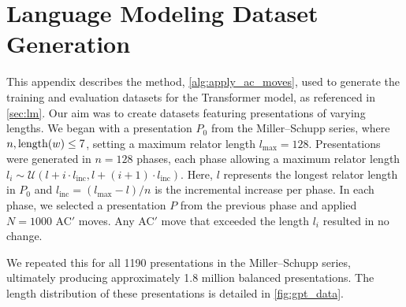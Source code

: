 
\section{Language Modeling Dataset Generation \label{app:algorithm}}

This appendix describes the method, \autoref{alg:apply_ac_moves}, used to generate the training and evaluation datasets for the Transformer model, as referenced in \autoref{sec:lm}. Our aim was to create datasets featuring presentations of varying lengths. We began with a presentation \(P_0\) from the Miller--Schupp series, where \(n, \operatorname{length}(w) \leq 7\), setting a maximum relator length \(l_{\text{max}} = 128\). Presentations were generated in \(n=128\) phases, each phase allowing a maximum relator length \(l_i \sim \mathcal{U}(l + i \cdot l_{\text{inc}}, l + (i+1) \cdot l_{\text{inc}})\). Here, \(l\) represents the longest relator length in \(P_0\) and \(l_{\text{inc}} = (l_{\text{max}} - l)/n\) is the incremental increase per phase. In each phase, we selected a presentation \(P\) from the previous phase and applied \(N=1000\) AC$'$ moves. Any AC$'$ move that exceeded the length \(l_i\) resulted in no change.
\newline

We repeated this for all 1190 presentations in the Miller--Schupp series, ultimately producing approximately 1.8 million balanced presentations. The length distribution of these presentations is detailed in \autoref{fig:gpt_data}.

